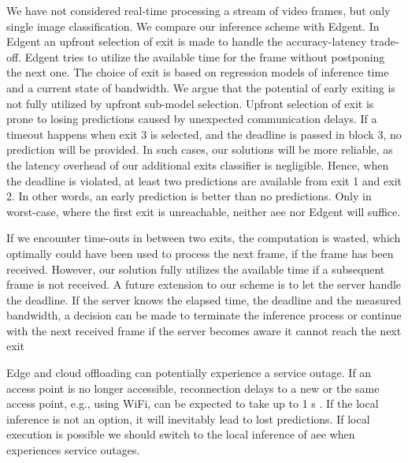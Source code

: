 We have not considered real-time processing a stream of video frames, but only single image classification. We compare our inference scheme with Edgent. In Edgent an upfront selection of exit is made to handle the accuracy-latency trade-off. Edgent tries to utilize the available time for the frame without postponing the next one. The choice of exit is based on regression models of inference time and a current state of bandwidth.  We argue that the potential of early exiting is not fully utilized by upfront sub-model selection. Upfront selection of exit is prone to losing predictions caused by unexpected communication delays. If a timeout happens when exit 3 is selected, and the deadline is passed in block 3, no prediction will be provided.  In such cases, our solutions will be more reliable, as the latency overhead of our additional exits classifier is negligible. Hence, when the deadline is violated, at least two predictions are available from exit 1 and exit 2. In other words, an early prediction is better than no predictions. Only in worst-case, where the first exit is unreachable, neither \gls{aee} nor Edgent will suffice. 

If we encounter time-outs in between two exits, the computation is wasted, which optimally could have been used to process the next frame, if the frame has been received. However, our solution fully utilizes the available time if a subsequent frame is not received. A future extension to our scheme is to let the server handle the deadline. If the server knows the elapsed time, the deadline and the measured bandwidth, a decision can be made to terminate the inference process or continue with the next received frame if the server becomes aware it cannot reach the next exit  

Edge and cloud offloading can potentially experience a service outage. If an access point is no longer accessible, reconnection delays to a new or the same access point, e.g., using WiFi, can be expected to take up to 1 s \cite{pei_why_2017}. If the local inference is not an option, it will inevitably lead to lost predictions. If local execution is possible we should switch to the local inference of \gls{aee} when experiences service outages. 
